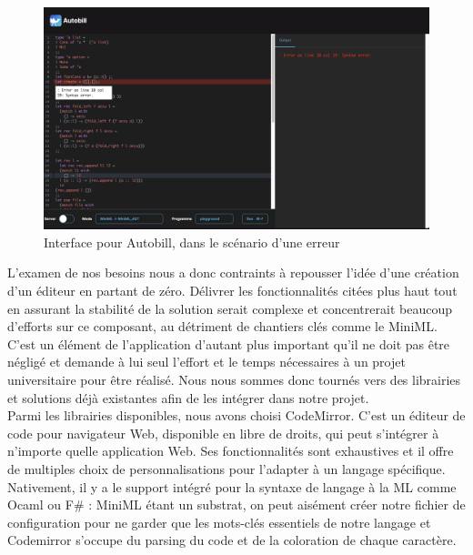 \documentclass[12pt]{article}
\begin{document}
\begin{figure}
      \centering
      \includegraphics[scale=0.36]{Figures/screen.png}
      \caption{Interface pour Autobill, dans le scénario d'une erreur\label{fig5}}
\end{figure}
L'examen de nos besoins nous a donc contraints à repousser l'idée d'une création d'un éditeur en partant de zéro.
Délivrer les fonctionnalités citées plus haut tout en assurant la stabilité de la solution serait complexe et concentrerait beaucoup d'efforts sur ce composant, au détriment de chantiers clés comme le MiniML. C'est un élément de l'application d'autant plus important qu'il ne doit pas être négligé et demande à lui seul l'effort et le temps nécessaires à un projet universitaire pour être réalisé. Nous nous sommes donc tournés vers des librairies et solutions déjà existantes afin de les intégrer dans notre projet. \\

Parmi les librairies disponibles, nous avons choisi CodeMirror\cite{codemirror}. C'est un éditeur de code pour navigateur Web, disponible en libre de droits, qui peut s'intégrer à n'importe quelle application Web. Ses fonctionnalités sont exhaustives et il offre de multiples choix de personnalisations pour l'adapter à un langage spécifique. Nativement, il y a le support intégré pour la syntaxe de langage à la ML comme Ocaml ou F\# : MiniML étant un substrat, on peut aisément créer notre fichier de configuration pour ne garder que les mots-clés essentiels de notre langage et Codemirror s'occupe du parsing du code et de la coloration de chaque caractère. \\
\end{document}

